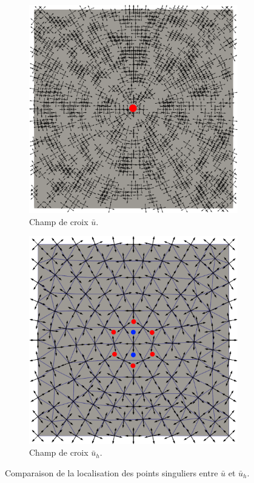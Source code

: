 \begin{figure}[h!]
\centering
\begin{subfigure}[b]{0.495\textwidth}
    \centering
    \includegraphics[width=\textwidth]{images/u_sing.pdf}
    \caption{Champ de croix $\bar{u}$.}
\end{subfigure}
\hfill
\begin{subfigure}[b]{0.495\textwidth}
    \centering
    \includegraphics[width=\textwidth]{images/u_h_sing.pdf}
    \caption{Champ de croix $\bar{u}_h$.}
\end{subfigure}
  \caption{Comparaison de la localisation des points singuliers entre $\bar{u}$ et $\bar{u}_h$.}
  \label{fig:eclatement_point_sing}
\end{figure}

